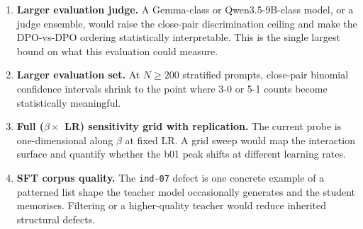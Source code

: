 \documentclass[../main.tex]{subfiles}
\begin{document}
\begin{enumerate}
  \item \textbf{Larger evaluation judge.} A Gemma-class or Qwen3.5-9B-class model, or a judge ensemble, would raise the close-pair discrimination ceiling and make the DPO-vs-DPO ordering statistically interpretable. This is the single largest bound on what this evaluation could measure.
  \item \textbf{Larger evaluation set.} At $N \geq 200$ stratified prompts, close-pair binomial confidence intervals shrink to the point where 3-0 or 5-1 counts become statistically meaningful.
  \item \textbf{Full ($\beta \times$ LR) sensitivity grid with replication.} The current probe is one-dimensional along $\beta$ at fixed LR. A grid sweep would map the interaction surface and quantify whether the b01 peak shifts at different learning rates.
  \item \textbf{SFT corpus quality.} The \texttt{ind-07} defect is one concrete example of a patterned list shape the teacher model occasionally generates and the student memorises. Filtering or a higher-quality teacher would reduce inherited structural defects.
\end{enumerate}
\end{document}
